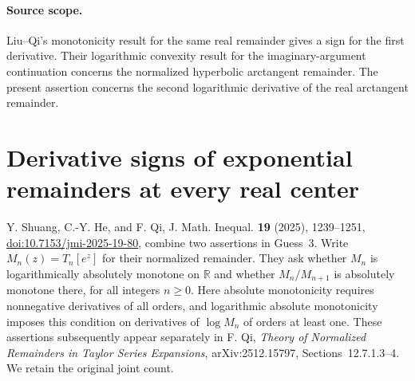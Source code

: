 \documentclass[11pt,a4paper]{article}
\numberwithin{equation}{section}
\begin{document}
\paragraph{Source scope.}
Liu--Qi's monotonicity result for the same real remainder gives a sign
for the first derivative. Their logarithmic convexity result for the
imaginary-argument continuation concerns the normalized hyperbolic
arctangent remainder. The present assertion concerns the second
logarithmic derivative of the real arctangent remainder.


\section{Derivative signs of exponential remainders at every real center}
\label{sec:normalized-remainder-oscillation}
Y. Shuang, C.-Y. He, and F. Qi, J. Math. Inequal. \textbf{19} (2025),
1239--1251, \href{https://doi.org/10.7153/jmi-2025-19-80}{doi:10.7153/jmi-2025-19-80},
combine two assertions in Guess~3. Write $M_n(z)=T_n[e^z]$ for their
normalized remainder. They ask whether $M_n$ is logarithmically absolutely
monotone on $\mathbb R$ and whether $M_n/M_{n+1}$ is absolutely
monotone there, for all integers $n\ge0$. Here absolute monotonicity
requires nonnegative derivatives of all orders, and logarithmic
absolute monotonicity imposes this condition on derivatives of
$\log M_n$ of orders at least one. These assertions subsequently
appear separately in F. Qi, \emph{Theory of Normalized Remainders in
Taylor Series Expansions}, arXiv:2512.15797, Sections~12.7.1.3--4.
We retain the original joint count.
\end{document}
